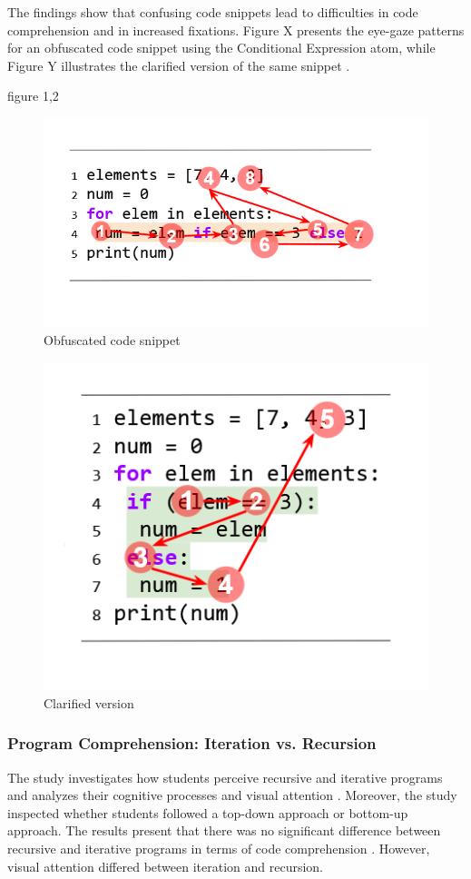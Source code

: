The findings show that confusing code snippets lead to difficulties in code comprehension and in increased fixations. Figure X presents the eye-gaze patterns for an obfuscated code snippet using the Conditional Expression atom, while Figure Y illustrates the clarified version of the same snippet \citet{silva2023evaluating}.
 
figure 1,2
\begin{figure} [H]
  \centering
  \includegraphics[scale=0.8]{figures/a.png}
  \caption{Obfuscated code snippet \citet{silva2023evaluating}}
  \label{fig:AnhangsChor}
\end{figure}

\begin{figure} [H]
  \centering
  \includegraphics[scale=0.8]{figures/b.png}
  \caption{Clarified version \citet{silva2023evaluating}}
  \label{fig:AnhangsChor}
\end{figure}


\subsubsection{Program Comprehension: Iteration vs. Recursion} 
The study \citet{aroobaunderstanding} investigates how students perceive recursive and iterative programs and analyzes their cognitive processes and visual attention \citet{aroobaunderstanding}. Moreover, the study inspected whether students followed a top-down approach or bottom-up approach.
The results present that there was no significant difference between recursive and iterative programs in terms of code comprehension \citet{aroobaunderstanding}.  However, visual attention differed between iteration and recursion. 

